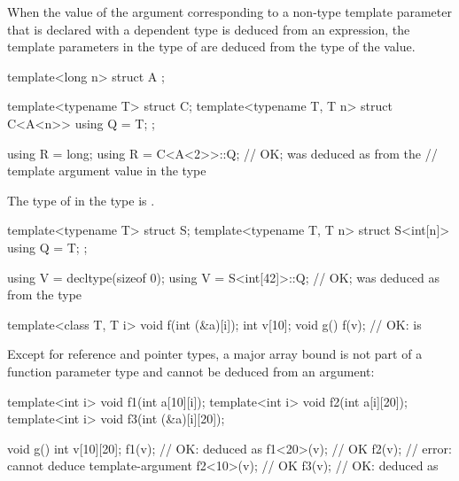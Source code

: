 \pnum
When the value of the argument
corresponding to a non-type template parameter 
that is declared with a dependent type
is deduced from an expression,
the template parameters in the type of 
are deduced from the type of the value.
\begin{example}
\begin{codeblock}
template<long n> struct A { };

template<typename T> struct C;
template<typename T, T n> struct C<A<n>> {
  using Q = T;
};

using R = long;
using R = C<A<2>>::Q;           // OK;  was deduced as  from the
                                // template argument value in the type 
\end{codeblock}
\end{example}
The type of  in the type  is .
\begin{example}
\begin{codeblock}
template<typename T> struct S;
template<typename T, T n> struct S<int[n]> {
  using Q = T;
};

using V = decltype(sizeof 0);
using V = S<int[42]>::Q;        // OK;  was deduced as  from the type 
\end{codeblock}
\end{example}

\pnum
\begin{example}
\begin{codeblock}
template<class T, T i> void f(int (&a)[i]);
int v[10];
void g() {
  f(v);                         // OK:  is 
}
\end{codeblock}
\end{example}

\pnum
\begin{note}
Except for reference and pointer types, a major array bound is not part of a
function parameter type and cannot be deduced from an argument:
\begin{codeblock}
template<int i> void f1(int a[10][i]);
template<int i> void f2(int a[i][20]);
template<int i> void f3(int (&a)[i][20]);

void g() {
  int v[10][20];
  f1(v);                        // OK:  deduced as 
  f1<20>(v);                    // OK
  f2(v);                        // error: cannot deduce template-argument 
  f2<10>(v);                    // OK
  f3(v);                        // OK:  deduced as 
}
\end{codeblock}
\end{note}

